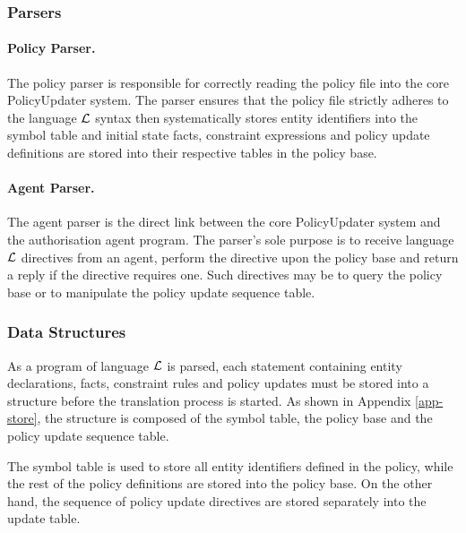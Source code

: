 \documentclass[11pt, twocolumn]{article}
\begin{document}
      \subsubsection{Parsers}

        \paragraph{Policy Parser.}

          The policy parser is responsible for correctly reading the policy
          file into the core PolicyUpdater system. The parser ensures that
          the policy file strictly adheres to the language $\cal{L}$ syntax
          then systematically stores entity identifiers into the symbol table
          and initial state facts, constraint expressions and policy update
          definitions are stored into their respective tables in the policy
          base.

        \paragraph{Agent Parser.}

          The agent parser is the direct link between the core PolicyUpdater
          system and the authorisation agent program. The parser's sole purpose
          is to receive language $\cal{L}$ directives from an agent, perform
          the directive upon the policy base and return a reply if the
          directive requires one. Such directives may be to query the policy
          base or to manipulate the policy update sequence table.

      \subsubsection{Data Structures}

        As a program of language ${\cal L}$ is parsed, each statement
        containing entity declarations, facts, constraint rules and policy
        updates must be stored into a structure before the translation process
        is started. As shown in Appendix \ref{app-store}, the structure is composed
        of the symbol table, the policy base and the policy update sequence
        table.

        The symbol table is used to store all entity identifiers defined in the
        policy, while the rest of the policy definitions are stored into the
        policy base. On the other hand, the sequence of policy update
        directives are stored separately into the update table.
\end{document}
